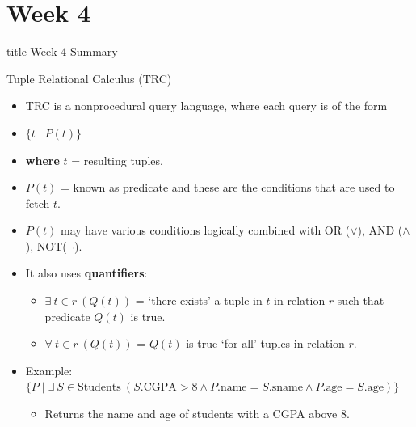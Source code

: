 \documentclass[aspectratio=169, xcolor=dvipsnames]{beamer}
\begin{document}
\section{Week 4}

\begin{frame}
  \vfill
  \centering
  \begin{beamercolorbox}[sep=8pt,center,shadow=true,rounded=true]{title}
    Week 4 Summary\par%
  \end{beamercolorbox}
  \vfill
\end{frame}

\begin{frame}{Tuple Relational Calculus (TRC)}
    \begin{itemize}[<+->]
        \item TRC is a nonprocedural query language, where each query is of the form
        \item[] $\{ t \mid P(t) \}$
        \item \textbf{where} $t$ = resulting tuples,
        \item $P(t)$ = known as predicate and these are the conditions that are used to fetch $t$.
        \item $P(t)$ may have various conditions logically combined with OR ($\lor$), AND ($\land$), NOT($\neg$).
        \item It also uses \textbf{quantifiers}:
        \begin{itemize}
            \item[$\triangleright$] $\exists\ t \in r\ (Q(t))$ = `there exists' a tuple in $t$ in relation $r$ such that predicate $Q(t)$ is true.
            \item[$\triangleright$] $\forall\ t \in r\ (Q(t))$ = $Q(t)$ is true `for all' tuples in relation $r$.
        \end{itemize}
        \item Example: $\{ P \mid \exists\ S \in \text{Students}\ (S.\text{CGPA} > 8 \land P.\text{name} = S.\text{sname} \land P.\text{age} = S.\text{age}) \}$
        \begin{itemize}
            \item[$\triangleright$] Returns the name and age of students with a CGPA above 8.
        \end{itemize}
    \end{itemize}
\end{frame}
\end{document}
